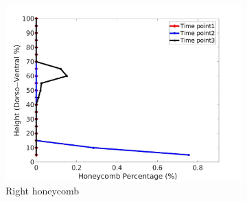 \begin{figure}[H]
\begin{subfigure}{.42\linewidth}
  \includegraphics[width=\linewidth,trim={{.0\wd0} {.0\wd0} {.0\wd0} {.0\wd0}},clip]{Appendix/Image_AppexA/DorsoToVentral/IPF5RightLungHoneycombDiseaseDorsoToVentral.jpg}
  \caption{Right honeycomb}
  \label{fig:IPF5DiseaseDorsoToVentral-f}
\end{subfigure}
\begin{subfigure}{.42\linewidth}%

\end{subfigure}
\end{figure}
